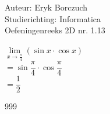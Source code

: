 \documentclass[a4paper]{article}
\begin{document}
  
\noindent \large Auteur: Eryk Borczuch \\
\noindent \large Studierichting: Informatica\\
\noindent \large Oefeningenreeks 2D nr. 1.13\\

\medskip

\normalsize

$\lim\limits_{x \rightarrow \tfrac{\pi}{4}} (\sin x \cdot \cos x) $\\

$= \sin \dfrac{\pi}{4} \cdot \cos \dfrac{\pi}{4}$\\

$= \dfrac{1}{2}$

\begin{thebibliography}{999}
\end{thebibliography}
\end{document}
